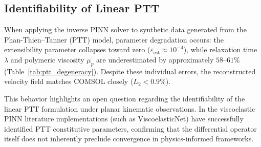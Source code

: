 \subsection{Identifiability of Linear PTT}
\label{subsec:kinematic_shear_degeneracy_ptt}

When applying the inverse PINN solver to synthetic data generated from the
Phan-Thien--Tanner (PTT) model, parameter degradation occurs: the extensibility
parameter collapses toward zero ($\varepsilon_{\mathrm{est}} \approx 10^{-4}$),
while relaxation time $\lambda$ and polymeric viscosity $\mu_p$ are underestimated
by approximately $58\text{--}61\%$ (Table~\ref{tab:ptt_degeneracy}). Despite these
individual errors, the reconstructed velocity field matches COMSOL closely ($L_2 < 0.9\%$).

\begin{table}[htbp]
    \centering
    \caption{PTT inverse problem parameter degradation and kinematic error under
    boundary velocity supervision.}
    \label{tab:ptt_degeneracy}
\end{table}

This behavior highlights an open question regarding the identifiability of the
linear PTT formulation under planar kinematic observations. In the viscoelastic PINN
literature implementations (such as ViscoelasticNet) have successfully identified PTT constitutive parameters, confirming that the
differential operator itself does not inherently preclude convergence in physics-informed
frameworks.

